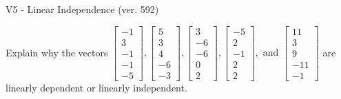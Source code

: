 \begin{exercise}
  \begin{exerciseTitle}V5 - Linear Independence (ver. 592)\end{exerciseTitle}
  \begin{exerciseStatement}
    Explain why the vectors \(\left[\begin{array}{r}
-1 \\
3 \\
-1 \\
-1 \\
-5
\end{array}\right] , \left[\begin{array}{r}
5 \\
3 \\
4 \\
-6 \\
-3
\end{array}\right] , \left[\begin{array}{r}
3 \\
-6 \\
-6 \\
0 \\
2
\end{array}\right] , \left[\begin{array}{r}
-5 \\
2 \\
-1 \\
2 \\
2
\end{array}\right] , \text{ and } \left[\begin{array}{r}
11 \\
3 \\
9 \\
-11 \\
-1
\end{array}\right]\) are linearly dependent or linearly independent.	



\end{exerciseStatement}
\end{exercise}
